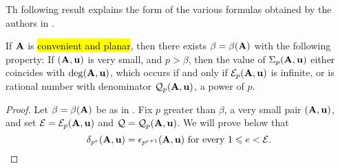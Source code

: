 \documentclass{amsart}
\begin{document}
Th following result explains the form of the various formulas obtained by the authors in \cite[Theorems~3.6, 4.8, and~5.5]{hernandez+etal.frobenius_examples}.

\begin{proposition}  If $\mathbf{A}$ is \hl{convenient and planar}, then there exists $\beta = \beta(\mathbf{A})$ with the following property:  If $(\mathbf{A}, \mathbf{u})$ is very small, and $p>\beta$, then the value of $\Sigma_p(\mathbf{A}, \mathbf{u})$ either coincides with $\deg(\mathbf{A}, \mathbf{u})$, which occurs if and only if $\mathcal{E}_p(\mathbf{A}, \mathbf{u})$ is infinite, or is rational number with denominator $\mathcal{Q}_p(\mathbf{A}, \mathbf{u})$, a power of $p$.

\begin{proof}  Let $\beta = \beta(\mathbf{A})$ be as in .  Fix $p$ greater than $\beta$, a very small pair  $(\mathbf{A}, \mathbf{u})$, and set $\mathcal{E} = \mathcal{E}_p(\mathbf{A}, \mathbf{u})$ and $\mathcal{Q} = \mathcal{Q}_p(\mathbf{A}, \mathbf{u})$.  We will prove below that
\begin{equation}
\label{delta-epsilon-for-convenient-planar-pairs: e}
\delta_{p^e}(\mathbf{A}, \mathbf{u}) = \epsilon_{p^{e+1}}(\mathbf{A}, \mathbf{u}) \text{ for every }1 \leqslant e < \mathcal{E}.
\end{equation}

\end{proof}

\end{proposition}
\end{document}
